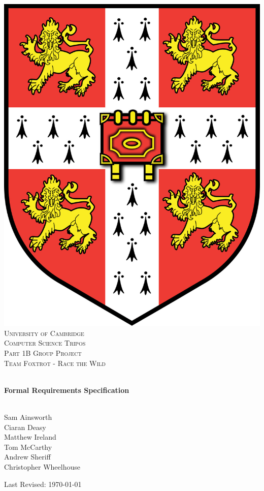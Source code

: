 \begin{titlepage}
\begin{center}
\includegraphics[scale=0.1]{camlogo.jpg}\\[1cm]    

\textsc{\LARGE University of Cambridge}\\[1.5cm]

\textsc{\Large Computer Science Tripos \\[2mm] Part 1B Group Project}\\[0.25cm]
\textsc{\Large Team Foxtrot - Race the Wild}\\[1.5cm]

\vspace{-8mm}

\HRule \\[0.4cm]
{ \huge \bfseries \vspace{3.5mm} Formal Requirements Specification }\\[0.4cm]

\HRule \\[1.9cm]

\begin{center}
\large
Sam Ainsworth\\
Ciaran Deasy\\
Matthew Ireland\\
Tom McCarthy\\
Andrew Sheriff\\
Christopher Wheelhouse\\
\end{center}

\vfill

{\large Last Revised: \today}
\end{center}
\end{titlepage}
